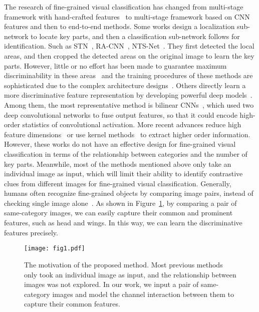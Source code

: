 \documentclass[conference]{IEEEtran}
\begin{document}
The research of fine-grained visual classification has changed from multi-stage framework with hand-crafted features~\cite{berg2013poof,yao2012codebook,chai2013symbiotic,gosselin2014revisiting} to multi-stage framework based on CNN features and then to end-to-end methods. Some works design a localization sub-network to locate key parts, and then a classification sub-network follows for identification. Such as STN~\cite{jaderberg2015spatial}, RA-CNN~\cite{fu2017look}, NTS-Net~\cite{yang2018learning}. They first detected the local areas, and then cropped the detected areas on the original image to learn the key parts. However, little or no effort has been made to guarantee maximum discriminability in these areas~\cite{du2020fine} and the training procedures of these methods are sophisticated due to the complex architecture designs~\cite{sun2018multi}. Others directly learn a more discriminative feature representation by developing powerful deep models~\cite{lin2015bilinear,gao2016compact,kong2017low,cui2017kernel,cai2017higher}. Among them, the most representative method is bilinear CNNs~\cite{lin2015bilinear}, which used two deep convolutional networks to fuse output features, so that it could encode high-order statistics of convolutional activation. More recent advances reduce high feature dimensions~\cite{gao2016compact,kong2017low} or use kernel methods~\cite{cui2017kernel,cai2017higher} to extract higher order information. However, these works do not have an effective design for fine-grained visual classification in terms of the relationship between categories and the number of key parts. Meanwhile, most of the methods mentioned above only take an individual image as input, which will limit their ability to identify contrastive clues from different images for fine-grained visual classification. Generally, humans often recognize fine-grained objects by comparing image pairs, instead of checking single image alone~\cite{zhuang2020learning}. As shown in Figure~\ref{fig:schematic}, by comparing 
a pair of same-category images, we can easily capture their common and prominent features, such as head and wings. In this way, we can learn the discriminative features precisely. 
\begin{figure}[t]
\centering
\texttt{[image: fig1.pdf]}
\caption{The motivation of the proposed method. Most previous methods only took an individual image as input, and the relationship between images was not explored. In our work, we input a pair of same-category images and model the channel interaction between them to capture their common features.
}
\label{fig:schematic}
\end{figure}
\end{document}
